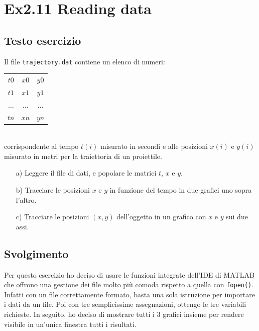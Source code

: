 \section{Ex2.11 Reading data}\label{sec:Reading_data}

\subsection{Testo esercizio}
Il file \verb|trajectory.dat| contiene un elenco di numeri:\\   
\begin{tabular}{ccc}
    $t0$    & $x0$      & $y0$    \\
    $t1$    & $x1$      & $y1$    \\
    $\dots$ & $\dots$   & $\dots$ \\
    $tn$    & $xn$      & $yn$    \\
\end{tabular}\\
corrispondente al tempo $t(i)$ misurato in secondi e alle posizioni $x(i)$ e 
$y(i)$  misurato in metri per la traiettoria di un proiettile.
    
\begin{itemize}
    \item[a)] Leggere il file di dati, e popolare le matrici $t$, $x$ e $y$.
        
    \item[b)] Tracciare le posizioni $x$ e $y$ in funzione del tempo in due 
    grafici uno sopra l'altro.
        
    \item[c)] Tracciare le posizioni $(x, y)$ dell'oggetto in un grafico 
    con $x$ e $y$ sui due assi.
\end{itemize}

\subsection{Svolgimento}
Per questo esercizio ho deciso di usare le funzioni integrate dell'IDE di 
MATLAB che offrono una gestione dei file molto più comoda rispetto a quella con 
\verb*|fopen()|. Infatti con un file correttamente formato, basta una sola 
istruzione per importare i dati da un file. Poi con tre semplicissime 
assegnazioni, ottengo le tre variabili richieste. In seguito, ho deciso di 
mostrare tutti i 3 grafici insieme per rendere visibile in un'unica finestra 
tutti i risultati.
